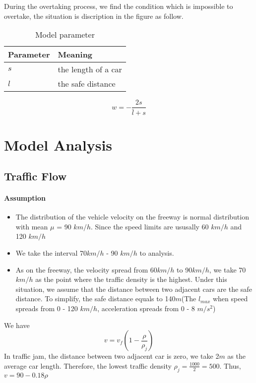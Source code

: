 During the overtaking
process, we find the condition which
is impossible to overtake, the situation
is discription in the figure as follow.

\begin{table}
\centering
\begin{tabular}{ll}
\hline
Parameter & Meaning\\
\hline
$s$ & the length of a car \\
$l$ & the safe distance \\
\hline
\end{tabular}
\caption{Model parameter}
\end{table}

\begin{equation}
w = - \frac{2s}{\bar{l} + s} 
\end{equation}
  

\section{Model Analysis}

\subsection{Traffic Flow}
\paragraph{Assumption}
\begin{itemize}
\item The distribution of the
vehicle velocity on the freeway
is normal distribution with mean
$\mu$ = 90 $km/h$. Since the speed 
limits are ususally 60 $km/h$ and 120 $km/h$
\item We take the interval 70$km/h$ - 90 $km/h$
to analysis.
\item As on the freeway, the velocity spread from
60$km/h$ to 90$km/h$, we take 70$km/h$ as the point where the traffic density is the highest.
Under this situation, we assume that the distance between two adjacent cars are the
safe distance. To simplify, the safe distance
equals to 140$m$(The $l_{max}$ when speed spreads from 0 - 120 $km/h$, acceleration spreads from 0 - 8 $m/s^2$)
\end{itemize}

We have 
\begin{equation}
v = v_f(1 - \frac{\rho}{\rho_j})
\end{equation}
In traffic jam, the distance between two adjacent car is zero, we take 2$m$ as the average car length. Therefore, the lowest
traffic density 
$\rho_j = \frac{1000}{2} = 500$.
Thus, $v = 90 - 0.18 \rho$

